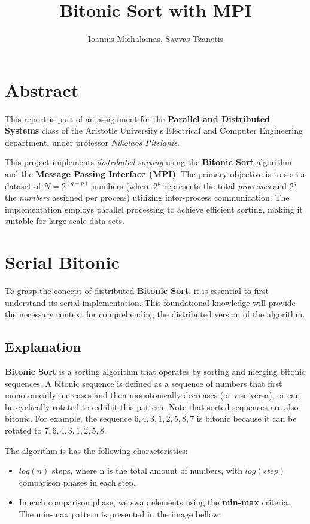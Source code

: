 \documentclass[12pt]{report}
\begin{document}
\title{\textbf{Bitonic Sort with MPI}}
\author{Ioannis Michalainas, Savvas Tzanetis}
\maketitle

\tableofcontents

\chapter{Abstract}
This report is part of an assignment for the \textbf{Parallel and Distributed Systems} class of the
Aristotle University's Electrical and Computer Engineering department, under professor \textit{Nikolaos Pitsianis}. 

This project implements \textit{distributed sorting} using the \textbf{Bitonic Sort} algorithm and the \textbf{Message Passing Interface (MPI)}. The primary objective is to sort a dataset of $N = 2^{(q+p)}$ numbers (where $2^p$ represents the total \textit{processes} and $2^q$ the \textit{numbers} assigned per process) utilizing inter-process communication. The implementation employs parallel processing to achieve efficient sorting, making it suitable for large-scale data sets.

\chapter{Serial Bitonic}

To grasp the concept of distributed \textbf{Bitonic Sort}, it is essential to first understand its serial implementation. This foundational knowledge will provide the necessary context for comprehending the distributed version of the algorithm.

\section{Explanation}

\textbf{Bitonic Sort} is a sorting algorithm that operates by sorting and merging bitonic sequences. A bitonic sequence is defined as a sequence of numbers that first monotonically increases and then monotonically decreases (or vise versa), or can be cyclically rotated to exhibit this pattern. Note that sorted sequences are also bitonic. For example, the sequence $6, 4, 3, 1, 2, 5, 8, 7$ is bitonic because it can be rotated to $7, 6, 4, 3, 1, 2, 5, 8$. 

The algorithm is has the following characteristics:
\begin{itemize}
    \item $log(n)$ steps, where n is the total amount of numbers, with $log(step)$ comparison phases in each step.
    \item In each comparison phase, we swap elements using the \textbf{min-max} criteria. The min-max pattern is presented in the image bellow:
\end{itemize}
\end{document}
